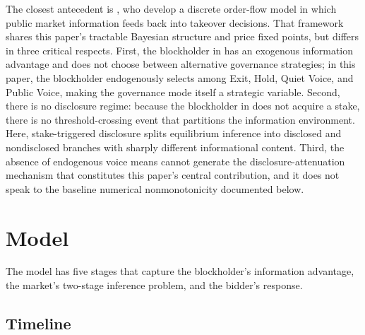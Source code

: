 \documentclass[11pt]{article}
\newcommand{\1}{\mathbf{1}}
\begin{document}
The closest antecedent is \citet{EdmansGoldsteinJiang2015}, who develop a discrete order-flow model in which public market information feeds back into takeover decisions. That framework shares this paper's tractable Bayesian structure and price fixed points, but differs in three critical respects. First, the blockholder in \citet{EdmansGoldsteinJiang2015} has an exogenous information advantage and does not choose between alternative governance strategies; in this paper, the blockholder endogenously selects among Exit, Hold, Quiet Voice, and Public Voice, making the governance mode itself a strategic variable. Second, there is no disclosure regime: because the blockholder in \citet{EdmansGoldsteinJiang2015} does not acquire a stake, there is no threshold-crossing event that partitions the information environment. Here, stake-triggered disclosure splits equilibrium inference into disclosed and nondisclosed branches with sharply different informational content. Third, the absence of endogenous voice means \citet{EdmansGoldsteinJiang2015} cannot generate the disclosure-attenuation mechanism that constitutes this paper's central contribution, and it does not speak to the baseline numerical nonmonotonicity documented below.
\section{Model}
\label{sec:model}

The model has five stages that capture the blockholder's information advantage, the market's two-stage inference problem, and the bidder's response.

%
\subsection{Timeline}
%
\end{document}
